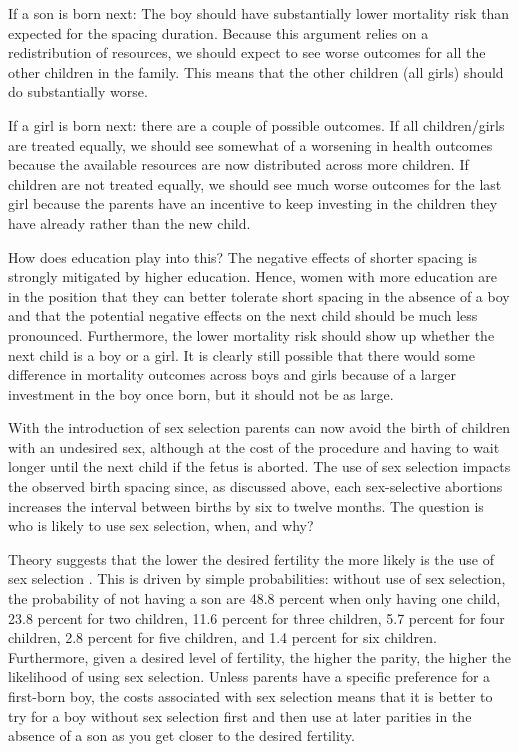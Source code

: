 If a son is born next:
The boy should have substantially lower mortality risk than expected for the spacing
duration.
Because this argument relies on a redistribution of resources, we should expect to see
worse outcomes for all the other children in the family.
This means that the other children (all girls) should do substantially worse.

If a girl is born next:
there are a couple of possible outcomes.
If all children/girls are treated equally, we should see somewhat of a worsening in 
health outcomes because the available resources are now distributed across more children.
If children are not treated equally, we should see much worse outcomes for the last
girl because the parents have an incentive to keep investing in the children they have
already rather than the new child.

How does education play into this?
The negative effects of shorter spacing is strongly mitigated by higher education.
Hence, women with more education are in the position that they can better tolerate short 
spacing in the absence of a boy and that the potential negative effects on the next child 
should be much less pronounced.
Furthermore, the lower mortality risk should show up whether the next child is a boy 
or a girl.
It is clearly still possible that there would some difference in mortality outcomes 
across boys and girls because of a larger investment in the boy once born, but it should
not be as large.

With the introduction of sex selection parents can now avoid the birth of children with 
an undesired sex, although at the cost of the procedure and having to wait longer until 
the next child if the fetus is aborted.
The use of sex selection impacts the observed birth spacing since, as discussed 
above, each sex-selective abortions increases the interval between births by six 
to twelve months.
The question is who is likely to use sex selection, when, and why?

Theory suggests that the lower the desired fertility the more likely is the use of sex 
selection \citep{Portner2015b}.
This is driven by simple probabilities:
without use of sex selection, the probability of not having a son are 48.8 percent when
only having one child, 23.8 percent for two children, 11.6 percent for three children, 
5.7 percent for four children, 2.8 percent for five children, and 1.4 percent for six 
children.
Furthermore, given a desired level of fertility, the higher the parity, the higher the
likelihood of using sex selection.
Unless parents have a specific preference for a first-born boy, the costs associated with 
sex selection means that it is better to try for a boy without sex selection first and 
then use at later parities in the absence of a son as you get closer to the desired 
fertility.

